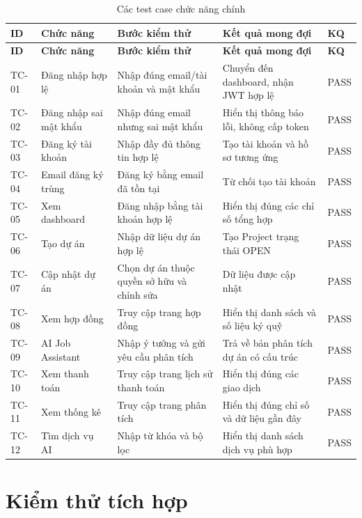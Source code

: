 \begin{longtable}{|p{1.5cm}|p{3.4cm}|p{4.0cm}|p{4.0cm}|p{1.3cm}|}
\caption{Các test case chức năng chính}
\label{tab:chapter6-functional-tests} \\ \hline
\textbf{ID} & \textbf{Chức năng} & \textbf{Bước kiểm thử} & \textbf{Kết quả mong đợi} & \textbf{KQ} \\ \hline
\endfirsthead
\hline
\textbf{ID} & \textbf{Chức năng} & \textbf{Bước kiểm thử} & \textbf{Kết quả mong đợi} & \textbf{KQ} \\ \hline
\endhead

TC-01 & Đăng nhập hợp lệ & Nhập đúng email/tài khoản và mật khẩu & Chuyển đến dashboard, nhận JWT hợp lệ & PASS \\ \hline
TC-02 & Đăng nhập sai mật khẩu & Nhập đúng email nhưng sai mật khẩu & Hiển thị thông báo lỗi, không cấp token & PASS \\ \hline
TC-03 & Đăng ký tài khoản & Nhập đầy đủ thông tin hợp lệ & Tạo tài khoản và hồ sơ tương ứng & PASS \\ \hline
TC-04 & Email đăng ký trùng & Đăng ký bằng email đã tồn tại & Từ chối tạo tài khoản & PASS \\ \hline
TC-05 & Xem dashboard & Đăng nhập bằng tài khoản hợp lệ & Hiển thị đúng các chỉ số tổng hợp & PASS \\ \hline
TC-06 & Tạo dự án & Nhập dữ liệu dự án hợp lệ & Tạo Project trạng thái OPEN & PASS \\ \hline
TC-07 & Cập nhật dự án & Chọn dự án thuộc quyền sở hữu và chỉnh sửa & Dữ liệu được cập nhật & PASS \\ \hline
TC-08 & Xem hợp đồng & Truy cập trang hợp đồng & Hiển thị danh sách và số liệu ký quỹ & PASS \\ \hline
TC-09 & AI Job Assistant & Nhập ý tưởng và gửi yêu cầu phân tích & Trả về bản phân tích dự án có cấu trúc & PASS \\ \hline
TC-10 & Xem thanh toán & Truy cập trang lịch sử thanh toán & Hiển thị đúng các giao dịch & PASS \\ \hline
TC-11 & Xem thống kê & Truy cập trang phân tích & Hiển thị đúng chỉ số và dữ liệu gần đây & PASS \\ \hline
TC-12 & Tìm dịch vụ AI & Nhập từ khóa và bộ lọc & Hiển thị danh sách dịch vụ phù hợp & PASS \\ \hline
\end{longtable}

\section{Kiểm thử tích hợp}
\label{sec:integration-testing-chapter6}

